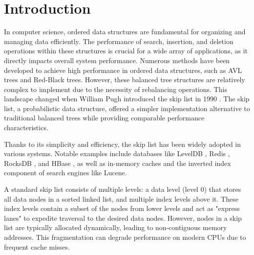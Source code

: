 \documentclass[sigconf]{acmart}
\begin{document}


\maketitle

\section{Introduction}
\label{sec:introduction}

In computer science, ordered data structures are fundamental for organizing and managing data efficiently. The performance of search, insertion, and deletion operations within these structures is crucial for a wide array of applications, as it directly impacts overall system performance.
Numerous methods have been developed to achieve high performance in ordered data structures, such as AVL trees and Red-Black trees. However, these balanced tree structures are relatively complex to implement due to the necessity of rebalancing operations. This landscape changed when William Pugh introduced the skip list in 1990 \cite{Pugh1990}. The skip list, a probabilistic data structure, offered a simpler implementation alternative to traditional balanced trees while providing comparable performance characteristics.

Thanks to its simplicity and efficiency, the skip list has been widely adopted in various systems. Notable examples include databases like LevelDB \cite{LevelDB}, Redis \cite{Redis}, RocksDB \cite{RocksDB}, and HBase \cite{HBase}, as well as in-memory caches and the inverted index component of search engines like Lucene.

A standard skip list consists of multiple levels: a data level (level 0) that stores all data nodes in a sorted linked list, and multiple index levels above it. These index levels contain a subset of the nodes from lower levels and act as "express lanes" to expedite traversal to the desired data nodes. However, nodes in a skip list are typically allocated dynamically, leading to non-contiguous memory addresses. This fragmentation can degrade performance on modern CPUs due to frequent cache misses.
\end{document}
